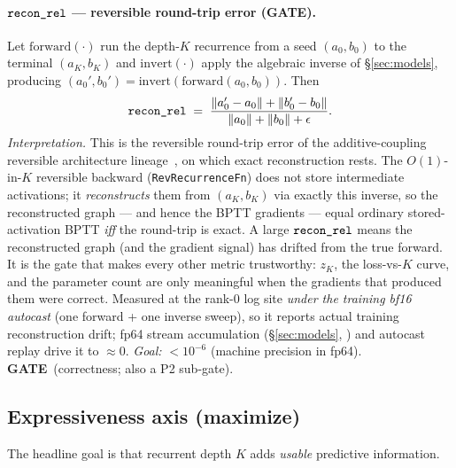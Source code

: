 \documentclass[11pt]{article}
\newcommand{\code}[1]{\texttt{#1}}
\newcommand{\GATE}{\textcolor{gate}{\textbf{GATE}}}
\begin{document}
\paragraph{\(\code{\detokenize{recon_rel}}\) --- reversible round-trip error (\GATE).}
Let \(\mathrm{forward}(\cdot)\) run the depth-\(K\) recurrence from a seed \((a_0,b_0)\) to the terminal
\((a_K,b_K)\) and \(\mathrm{invert}(\cdot)\) apply the algebraic inverse of
\S\ref{sec:models}, producing \((a_0',b_0')=\mathrm{invert}(\mathrm{forward}(a_0,b_0))\).  Then
\begin{equation}
\label{eq:recon-rel}
  \code{\detokenize{recon_rel}}
  \;=\;
  \frac{\lVert a_0'-a_0\rVert+\lVert b_0'-b_0\rVert}{\lVert a_0\rVert+\lVert b_0\rVert+\epsilon}.
\end{equation}
\emph{Interpretation.}  This is the reversible round-trip error of the additive-coupling reversible
architecture lineage~\cite{revnet,reformer,revffn}, on which exact reconstruction rests.
The \(O(1)\)-in-\(K\) reversible backward (\code{RevRecurrenceFn}) does not
store intermediate activations; it \emph{reconstructs} them from \((a_K,b_K)\) via exactly this inverse,
so the reconstructed graph --- and hence the BPTT gradients --- equal ordinary stored-activation BPTT
\emph{iff} the round-trip is exact.  A large \(\code{\detokenize{recon_rel}}\) means the reconstructed
graph (and the gradient signal) has drifted from the true forward.  It is the gate that makes every
other metric trustworthy: \(z_K\), the loss-vs-\(K\) curve, and the parameter count are only meaningful
when the gradients that produced them were correct.  Measured at the rank-0 log site \emph{under the
training bf16 autocast} (one forward + one inverse sweep), so it reports actual training reconstruction
drift; fp64 stream accumulation (\S\ref{sec:models}, \code{}) and
autocast replay drive it to \(\approx0\).  \emph{Goal:} \(<10^{-6}\) (machine precision in fp64).
\GATE\ (correctness; also a P2 sub-gate).

\subsection{Expressiveness axis (maximize)}
\label{ssec:expressiveness}
The headline goal is that recurrent depth \(K\) adds \emph{usable} predictive information.
\end{document}
